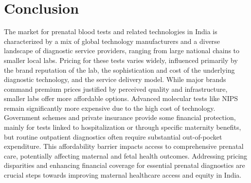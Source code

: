 \documentclass{article}
\begin{document}
\section{Conclusion}
The market for prenatal blood tests and related technologies in India is characterized by a mix of global technology manufacturers and a diverse landscape of diagnostic service providers, ranging from large national chains to smaller local labs. Pricing for these tests varies widely, influenced primarily by the brand reputation of the lab, the sophistication and cost of the underlying diagnostic technology, and the service delivery model. While major brands command premium prices justified by perceived quality and infrastructure, smaller labs offer more affordable options. Advanced molecular tests like NIPS remain significantly more expensive due to the high cost of technology. Government schemes and private insurance provide some financial protection, mainly for tests linked to hospitalization or through specific maternity benefits, but routine outpatient diagnostics often require substantial out-of-pocket expenditure. This affordability barrier impacts access to comprehensive prenatal care, potentially affecting maternal and fetal health outcomes. Addressing pricing disparities and enhancing financial coverage for essential prenatal diagnostics are crucial steps towards improving maternal healthcare access and equity in India.
\end{document}
